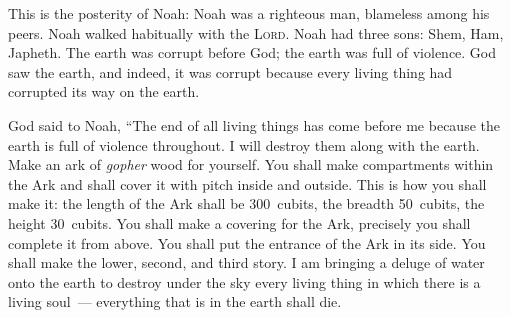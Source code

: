 \begin{inparaenum}
     This is the posterity of Noah: Noah was a righteous man, blameless among his peers. Noah walked habitually with the \textsc{Lord}.%
     Noah had three sons: Shem, Ham, Japheth.%
     The earth was corrupt before God; the earth was full of violence.%
     God saw the earth, and indeed, it was corrupt because every living thing had corrupted its way on the earth.%
    
     God said to Noah, ``The end of all living things has come before me because the earth is full of violence throughout. I will destroy them along with the earth.%
     Make an ark of \textit{gopher} wood for yourself. You shall make compartments within the Ark and shall cover it with pitch inside and outside.%
     This is how you shall make it: the length of the Ark shall be 300~cubits, the breadth 50~cubits, the height 30~cubits.%
     You shall make a covering for the Ark, precisely you shall complete it from above. You shall put the entrance of the Ark in its side. You shall make the lower, second, and third story.\understood%
     I am bringing a deluge of water onto the earth to destroy under the sky every living thing in which there is a living soul~--- everything that is in the earth shall die.%

\end{inparaenum}
